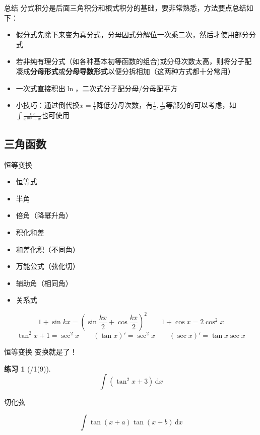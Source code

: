 \documentclass[UTF8]{ctexbeamer}
\def\diff{\,\mathrm{d}}
\newtheorem{exercise}[theorem]{练习} %
\begin{document}
\begin{frame}{总结}
分式积分是后面三角积分和根式积分的基础，要非常熟悉，方法要点总结如下：
\begin{itemize}
	\item 假分式先除下来变为真分式，分母因式分解位一次乘二次，然后才使用部分分式
	\item 若非纯有理分式（如各种基本初等函数的组合)或分母次数太高，则将分子配凑成\textbf{分母形式}或\textbf{分母导数形式}以便分拆相加（这两种方式都十分常用）
	\item 一次式直接积出$\ln$，二次式分子配分母/分母配平方
	\item 小技巧：通过倒代换$\displaystyle x=\frac{1}{t}$降低分母次数，有$\displaystyle\frac{1}{x},\frac{1}{x^2}$等部分的可以考虑，如$\displaystyle\int\frac{\diff x}{x^{100}+x}$也可使用
\end{itemize}
\end{frame}

\subsection{三角函数}
\begin{frame}
\subsectionpage
\end{frame}

\begin{frame}{恒等变换}
\begin{itemize}
	\item 恒等式
	\item 半角
	\item 倍角（降幂升角）
	\item 积化和差
	\item 和差化积（不同角）
	\item 万能公式（弦化切）
	\item 辅助角（相同角）
	\item 关系式
\end{itemize}
\[1+\sin kx=\left(\sin\frac{kx}{2}+\cos\frac{kx}{2}\right)^2\qquad1+\cos x=2\cos^2 x\]
\[\tan^2 x+1=\sec^2 x\qquad(\tan x)'=\sec^2 x\qquad(\sec x)'=\tan x\sec x\]
\end{frame}

\begin{frame}{恒等变换}
变换就是了！
\begin{exercise}[/1(9)]
\[\int(\tan^2 x+3)\diff x\]
\end{exercise}
切化弦
\begin{example}
\[\int \tan(x+a)\tan(x+b)\diff x\]
\end{example}
\end{frame}
\end{document}
